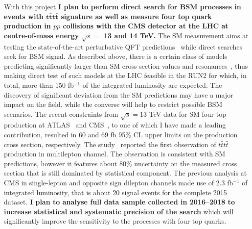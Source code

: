 \textcolor{\mycolor}{
With this project \textbf{I plan to perform direct search for BSM processes in events with $\pmb{t\bar{t}t\bar{t}}$ signature  as well as measure four top quark production in $pp$ collisions with the CMS detector at the LHC at centre-of-mass energy $\sqrt{s}=$ 13 and 14 TeV.} The SM measurement aims at testing the state-of-the-art perturbative QFT predictions~\cite{Bevilacqua:2012em,Frederix:2017wme} while direct searches seek for BSM signal. As described above, there is a certain class of models predicting significantly larger than SM cross section values and resonances~\cite{Lillie:2007hd, Gregoire:2011ka, Pomarol:2008bh}, thus making direct test of such models at the LHC feasible in the RUN2 for which, in total, more than 150 fb$^{-1}$ of the integrated luminosity are expected. The discovery of significant deviation from the SM predictions may have a major impact on the field, while the converse will help to restrict possible BSM scenarios. The recent constraints from $\sqrt{s}=13$ TeV data for SM four top production at ATLAS~\cite{Aaboud:2017faq} and CMS~\cite{Sirunyan:2017tep}, to one of which I have made a leading contribution,
resulted in 60 and 69 fb 95\% CL upper limits on the production cross section, respectively. The study~\cite{Sirunyan:2017roi} reported the first observation of $t\bar{t}t\bar{t}$ production in multilepton channel. The observation is consistent with SM predictions, however it features about 80\% uncertainty on the measured cross section that is still dominated by statistical component.
}
\textcolor{\mycolor}{
The previous analysis at CMS in single-lepton and opposite sign dilepton channels made use of 2.3 fb$^{-1}$ of integrated luminosity, that is about 20 signal events for the complete 2015 dataset. \textbf{I plan to analyse full data sample collected in 2016--2018 to increase statistical and systematic precision of the search} which will significantly improve the sensitivity to the processes with four top quarks. }


